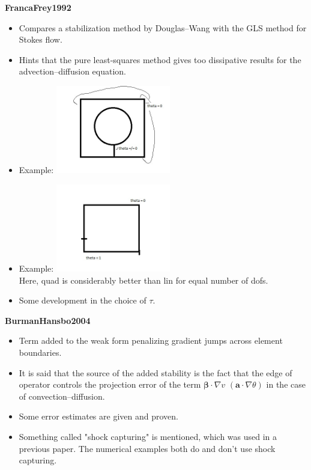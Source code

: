 \documentclass{article}
\newcommand{\bs}[1]{\boldsymbol{#1}}
\begin{document}
\textbf{FrancaFrey1992}
\begin{itemize}
\item Compares a stabilization method by Douglas--Wang with the GLS method for Stokes flow.
\item Hints that the pure least-squares method gives too dissipative results for the advection--diffusion equation.
\item Example: \includegraphics[width=5cm]{figures/FrancaFrey1992_img1.jpg}
\item Example: \includegraphics[width=5cm]{figures/FrancaFrey1992_img2.jpg}\\
Here, quad is considerably better than lin for equal number of dofs.
\item Some development in the choice of $\tau$.
\end{itemize}

\textbf{BurmanHansbo2004}
\begin{itemize}
\item Term added to the weak form penalizing gradient jumps across element boundaries.
\item It is said that the source of the added stability is the fact that the edge of operator controls the projection error of the term $\bs{\beta}\cdot\nabla v$ $(\bs{a}\cdot\nabla\theta)$ in the case of convection--diffusion.
\item Some error estimates are given and proven.
\item Something called "shock capturing" is mentioned, which was used in a previous paper. The numerical examples both do and don't use shock capturing.
\end{itemize}
\end{document}
